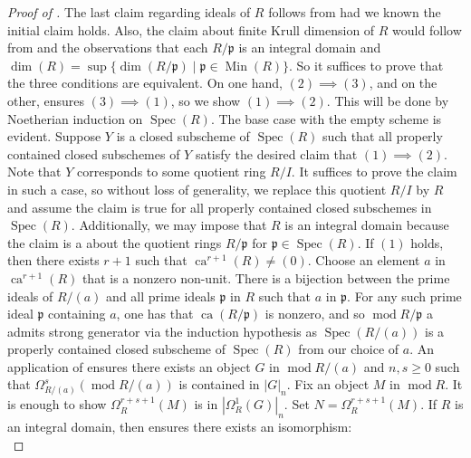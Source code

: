 \documentclass[11pt]{amsart}
\theoremstyle{plain}
\theoremstyle{definition}
\numberwithin{equation}{section}
\numberwithin{theorem}{section}
\begin{document}
\begin{proof}[Proof of ]
    The last claim regarding ideals of $R$ follows from  had we known the initial claim holds. Also, the claim about finite Krull dimension of $R$ would follow from  and the observations that each $R/\mathfrak p$ is an integral domain and $\dim(R)=\sup\{\dim(R/\mathfrak{p})\mid \mathfrak p\in \operatorname{Min}(R)\}$. So it suffices to prove that the three conditions are equivalent. On one hand, $(2)\implies (3)$, and on the other,  ensures $(3)\implies (1)$, so we show $(1)\implies (2)$. This will be done by Noetherian induction on $\operatorname{Spec}(R)$. The base case with the empty scheme is evident. Suppose $Y$ is a closed subscheme of $\operatorname{Spec}(R)$ such that all properly contained closed subschemes of $Y$ satisfy the desired claim that $(1)\implies (2)$. Note that $Y$ corresponds to some quotient ring $R/I$. It suffices to prove the claim in such a case, so without loss of generality, we replace this quotient $R/I$ by $R$ and assume the claim is true for all properly contained closed subschemes in $\operatorname{Spec}(R)$. Additionally, we may impose that $R$ is an integral domain because the claim is a about the quotient rings $R/\mathfrak{p}$ for $\mathfrak{p}\in \operatorname{Spec}(R)$. If $(1)$ holds, then there exists $r+1$ such that $\operatorname{ca}^{r+1}(R) \not= (0)$. Choose an element $a$ in $ \operatorname{ca}^{r+1}(R)$ that is a nonzero non-unit. There is a bijection between the prime ideals of $R/(a)$ and all prime ideals $\mathfrak{p}$ in $R$ such that $a$ in $ \mathfrak{p}$. For any such prime ideal $\mathfrak{p}$ containing $a$, one has that $\operatorname{ca}(R/\mathfrak{p})$ is nonzero, and so $\operatorname{mod}R/\mathfrak{p}$ a admits strong generator via the induction hypothesis as $\operatorname{Spec}(R/(a))$ is a properly contained closed subscheme of $\operatorname{Spec}(R)$ from our choice of $a$. An application of  ensures there exists an object $G$ in $ \operatorname{mod}R/(a)$ and $n,s\geq 0$ such that $\Omega_{R/(a)}^s (\operatorname{mod}R/(a)) $ is contained in $ |G|_n$. Fix an object $M$ in $ \operatorname{mod}R$. It is enough to show $\Omega_R^{r+s+1} (M) $ is in $ |\Omega^1_R (G)|_n$. Set $N=\Omega^{r+s+1}_R (M)$. If $R$ is an integral domain, then  ensures there exists an isomorphism:
    \begin{displaymath}

\end{displaymath}
\end{proof}
\end{document}
